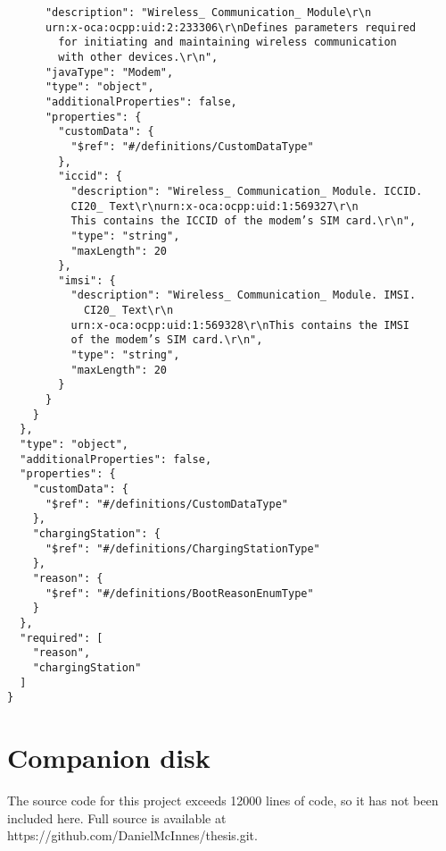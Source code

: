 \documentclass[12pt,openany,a4paper]{book}
\begin{document}
\begin{verbatim}
      "description": "Wireless_ Communication_ Module\r\n
      urn:x-oca:ocpp:uid:2:233306\r\nDefines parameters required 
      	for initiating and maintaining wireless communication 
      	with other devices.\r\n",
      "javaType": "Modem",
      "type": "object",
      "additionalProperties": false,
      "properties": {
        "customData": {
          "$ref": "#/definitions/CustomDataType"
        },
        "iccid": {
          "description": "Wireless_ Communication_ Module. ICCID. 
          CI20_ Text\r\nurn:x-oca:ocpp:uid:1:569327\r\n
          This contains the ICCID of the modem’s SIM card.\r\n",
          "type": "string",
          "maxLength": 20
        },
        "imsi": {
          "description": "Wireless_ Communication_ Module. IMSI. 
          	CI20_ Text\r\n
          urn:x-oca:ocpp:uid:1:569328\r\nThis contains the IMSI 
          of the modem’s SIM card.\r\n",
          "type": "string",
          "maxLength": 20
        }
      }
    }
  },
  "type": "object",
  "additionalProperties": false,
  "properties": {
    "customData": {
      "$ref": "#/definitions/CustomDataType"
    },
    "chargingStation": {
      "$ref": "#/definitions/ChargingStationType"
    },
    "reason": {
      "$ref": "#/definitions/BootReasonEnumType"
    }
  },
  "required": [
    "reason",
    "chargingStation"
  ]
}
\end{verbatim}




\chapter{Companion disk}
The source code for this project exceeds 12000 lines of code, so it has not been included here. Full source is available at https://github.com/DanielMcInnes/thesis.git.

\nocite{*}


\end{document}
